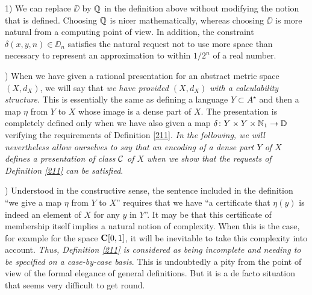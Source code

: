 \begin{remarks} \label{212}
1) We can replace $\DD$ by $\mathbb {Q}$ in the definition above without modifying the notion that is defined. Choosing $\mathbb {Q}$ is nicer mathematically, whereas choosing $\DD$ is more natural from a computing point of view. In addition, the constraint $\delta(x,y,n) \in \DD_n$ satisfies the natural request not to use more space than necessary to represent an approximation to within $1/2^n$ of a real number.

) When we have given a rational presentation for an abstract metric space $(X,d_X)$, we will say that {\em we have provided $(X,d_X)$ with a calculability structure}. This is essentially the same as defining a language $Y \subset A^{\star}$ and then a  map $\eta$ from $Y$ to $X$ whose image is a dense part of $X$. The presentation is completely defined only when we have also given a map $\delta\colon Y \times Y \times \mathbb {N}_1 \to \mathbb {D}$ verifying the requirements of Definition \ref{211}. 
{\em In the following, we will nevertheless allow ourselves to say that an encoding of a dense part $Y$ of $X$ defines a presentation of class ${{\cal C}}$ of $X$ when we show that the requests of Definition \ref{211} can be satisfied}. 

) Understood in the constructive sense, the sentence included in the definition ``we give a  map $\eta$ from $Y$ to $X$'' requires that we have ``a certificate that $\eta(y)$ is indeed an element of $X$ for any $y$ in $Y$''. 	
It may be that this certificate of membership itself implies a natural notion of complexity. When this is the case, for example for the space ${{\bf C}[0,1]}$, it will be inevitable to take this complexity into account. {\em Thus, Definition \ref{211} is considered as being incomplete and needing to be specified on a case-by-case basis}. This is undoubtedly a pity from the point of view of the formal elegance of general definitions. But it is a de facto situation that seems very difficult to get round. 
\end{remarks}

